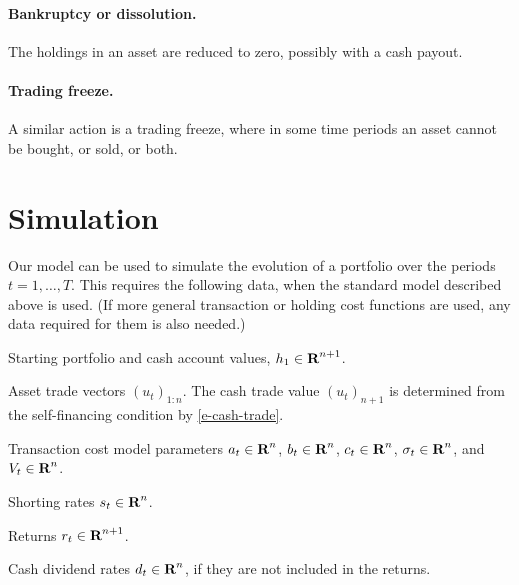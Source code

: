 \documentclass[openany]{now}
\begin{document}
\paragraph{Bankruptcy or dissolution.}
The holdings in an asset are reduced to zero, possibly with a cash payout.

\paragraph{Trading freeze.}
A similar action is a trading freeze,
where in some time periods an asset cannot be bought, or sold, or both.

\section{Simulation}
Our model can be used to simulate the evolution of a portfolio
over the periods $t=1,\ldots, T$.
This requires the following data, when the standard model described above is used.
(If more general transaction or holding cost functions are used, any data
required for them is also needed.)
\BIT\itemsep -2pt
\item Starting portfolio and cash account values, $h_1\in {\mbox{\bf R}}^{n+1}$.
\item Asset trade vectors $(u_t)_{1:n}$.
The cash trade value $(u_t)_{n+1}$ is determined from the self-financing
condition by \eqref{e-cash-trade}.
\item Transaction cost model parameters $a_t \in {\mbox{\bf R}}^n$,
$b_t \in {\mbox{\bf R}}^n$, $c_t\in {\mbox{\bf R}}^n$,
$\sigma_t \in {\mbox{\bf R}}^n$, and $V_t \in {\mbox{\bf R}}^n$.
\item Shorting rates $s_t\in {\mbox{\bf R}}^n$.
\item Returns $r_t\in {\mbox{\bf R}}^{n+1}$.
\item Cash dividend rates $d_t\in {\mbox{\bf R}}^n$,
if they are not included in the returns.
\EIT
\end{document}
